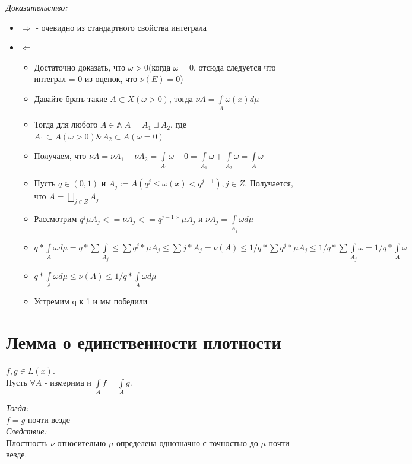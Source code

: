 \documentclass[paper=a4, fontsize=17pt]{article}
\begin{document}
	\emph{Доказательство:}
	 	\begin{itemize}
	 		\item $\Rightarrow$ - очевидно из стандартного свойства интеграла
	 		\item $\Leftarrow$\par
	 		\begin{itemize}
	 			\item 
	 			Достаточно доказать, что $\omega > 0$(когда $\omega = 0$, отсюда следуется что интеграл = 0 из оценок, что $\nu(E) = 0$)
	 			\item 
	 			Давайте брать такие $A \subset X(\omega > 0)$, тогда $\nu A = \int\limits_A \omega(x) d\mu$
	 			\item 
	 			Тогда для любого $A\in\mathbb{A}$ $A = A_1 \sqcup A_2$, где $A_1 \subset A(\omega > 0) \& A_2 \subset A(\omega = 0)$
	 			\item
	 			Получаем, что $\nu A = \nu A_1 + \nu A_2  = \int\limits_{A_1}\omega + 0 = \int\limits_{A_1}\omega + \int\limits_{A_2}\omega = \int\limits_{A}\omega$
	 			\item 
	 			Пусть $q\in(0, 1)$ и $A_j:=A(q^j \leq \omega(x) < q^{j - 1}), j \in Z$. Получается, что $A = \bigsqcup_{j \in Z} A_j$
	 			\item
	 			Рассмотрим $q^j \mu A_j <= \nu A_j <= q^{j - 1} * \mu A_j$ и $\nu A_j = \int\limits_{A_j}\omega d\mu$
	 			\item
	 			$q * \int\limits_A \omega d\mu = q * \sum \int\limits_{A_j} \leq \sum q^j * \mu A_j \leq \sum j * A_j = \nu(A) \leq 1 / q * \sum q^j * \mu A_j \leq 1 / q * \sum \int\limits_{A_j} \omega = 1 /q * \int\limits_A \omega$
	 			\item
	 			$q * \int\limits_A \omega d\mu \leq \nu(A) \leq 1 / q * \int\limits_A \omega d\mu$
	 			\item 
	 			Устремим q к 1 и мы победили
	 		\end{itemize}
	 	\end{itemize} 

\section{Лемма о единственности плотности}
	$f, g \in L(x)$. \\
	Пусть $\forall A$ - измерима и $\int\limits_A f = \int\limits_A g$.
	
	\emph{Тогда: } \\
		$f = g$ почти везде \\
	\emph{Следствие: } \\
		Плостность $\nu$ относительно $\mu$ определена однозначно с точностью до $\mu$ почти везде.
		
\end{document}
